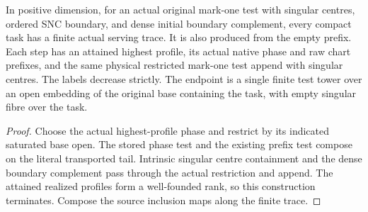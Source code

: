 \begin{theorem}
\label{hir:g8-finite-actual-native-test-serving}
\leanok
In positive dimension, for an actual original mark-one test with
singular centres, ordered SNC boundary, and dense initial boundary
complement, every compact task has a finite actual serving trace.
It is also produced from the empty prefix. Each step has an attained
highest profile, its actual native phase and raw chart prefixes,
and the same physical restricted mark-one test append with singular
centres. The labels decrease strictly. The endpoint is a single
finite test tower over an open embedding of the original base
containing the task, with empty singular fibre over the task.
\end{theorem}
\begin{proof}
Choose the actual highest-profile phase and restrict by its indicated
saturated base open. The stored phase test and the existing prefix
test compose on the literal transported tail. Intrinsic singular
centre containment and the dense boundary complement pass through the
actual restriction and append. The attained realized profiles form
a well-founded rank, so this construction terminates. Compose the
source inclusion maps along the finite trace.
\end{proof}

